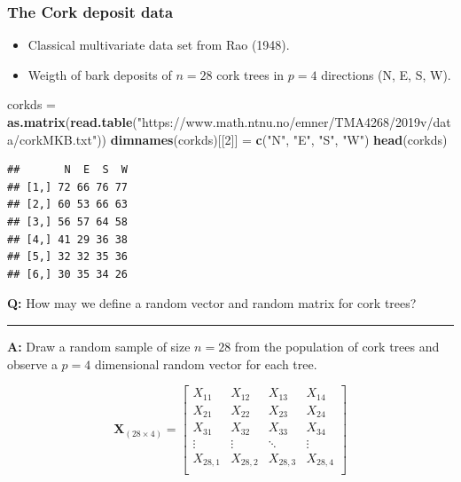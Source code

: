 \documentclass[]{article}
\newenvironment{Shaded}{\begin{snugshade}}{\end{snugshade}}
\newcommand{\DecValTok}[1]{\textcolor[rgb]{0.00,0.00,0.81}{#1}}
\newcommand{\KeywordTok}[1]{\textcolor[rgb]{0.13,0.29,0.53}{\textbf{#1}}}
\newcommand{\NormalTok}[1]{#1}
\newcommand{\StringTok}[1]{\textcolor[rgb]{0.31,0.60,0.02}{#1}}
\providecommand{\tightlist}{%
  \setlength{\itemsep}{0pt}\setlength{\parskip}{0pt}}
\begin{document}
\hypertarget{the-cork-deposit-data}{%
\subsubsection{The Cork deposit data}\label{the-cork-deposit-data}}

\begin{itemize}
\tightlist
\item
  Classical multivariate data set from Rao (1948).
\item
  Weigth of bark deposits of \(n=28\) cork trees in \(p=4\) directions
  (N, E, S, W).
\end{itemize}

\begin{Shaded}
\begin{Highlighting}[]
\NormalTok{corkds =}\StringTok{ }\KeywordTok{as.matrix}\NormalTok{(}\KeywordTok{read.table}\NormalTok{(}\StringTok{"https://www.math.ntnu.no/emner/TMA4268/2019v/data/corkMKB.txt"}\NormalTok{))}
\KeywordTok{dimnames}\NormalTok{(corkds)[[}\DecValTok{2}\NormalTok{]] =}\StringTok{ }\KeywordTok{c}\NormalTok{(}\StringTok{"N"}\NormalTok{, }\StringTok{"E"}\NormalTok{, }\StringTok{"S"}\NormalTok{, }\StringTok{"W"}\NormalTok{)}
\KeywordTok{head}\NormalTok{(corkds)}
\end{Highlighting}
\end{Shaded}

\begin{verbatim}
##       N  E  S  W
## [1,] 72 66 76 77
## [2,] 60 53 66 63
## [3,] 56 57 64 58
## [4,] 41 29 36 38
## [5,] 32 32 35 36
## [6,] 30 35 34 26
\end{verbatim}

\textbf{Q:} How may we define a random vector and random matrix for cork
trees?

\begin{center}\rule{0.5\linewidth}{\linethickness}\end{center}

\textbf{A:} Draw a random sample of size \(n=28\) from the population of
cork trees and observe a \(p=4\) dimensional random vector for each
tree.

\[\mathbf{X}_{(28 \times 4)}=\left[ \begin{array}{cccc}X_{11} & X_{12} & X_{13}& X_{14}\\ X_{21} & X_{22} & X_{23}& X_{24}\\ X_{31} & X_{32} & X_{33}& X_{34}\\ \vdots & \vdots & \ddots & \vdots\\ X_{28,1} & X_{28,2} & X_{28,3}& X_{28,4}\\ \end{array} \right]\]
\end{document}

